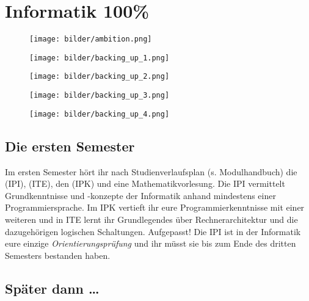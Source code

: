 \section{Informatik 100\%}

\begin{figure}[b]
\centering
\texttt{[image: bilder/ambition.png]}
\end{figure}

\begin{figure*}[th]
\centering
    \begin{subfigure}{.23\textwidth}
        \texttt{[image: bilder/backing\_up\_1.png]}
    \end{subfigure}
    \begin{subfigure}{.23\textwidth}
        \texttt{[image: bilder/backing\_up\_2.png]}
    \end{subfigure}
    \begin{subfigure}{.23\textwidth}
        \texttt{[image: bilder/backing\_up\_3.png]}
    \end{subfigure}
    \begin{subfigure}{.23\textwidth}
        \texttt{[image: bilder/backing\_up\_4.png]}
    \end{subfigure}
\end{figure*}

\subsection{Die ersten Semester}

Im ersten Semester hört ihr nach Studienverlaufsplan (s. Modulhandbuch) die  (\gls{IPI}),  (\gls{ITE}), den  (\gls{IPK}) und eine Mathematikvorlesung. Die \gls{IPI} vermittelt Grundkenntnisse und -konzepte der Informatik anhand mindestens einer Programmiersprache. Im \gls{IPK} vertieft ihr eure Programmierkenntnisse mit einer weiteren und in \gls{ITE} lernt ihr Grundlegendes über Rechnerarchitektur und die dazugehörigen logischen Schaltungen. Aufgepasst! Die \gls{IPI} ist in der Informatik eure einzige \emph{Orientierungsprüfung} und ihr müsst sie bis zum Ende des dritten Semesters bestanden haben.


\subsection{Später dann \dots{}}

